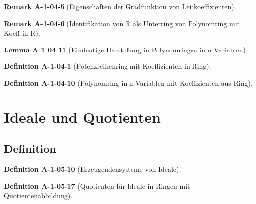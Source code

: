 \documentclass[10pt, letterpaper]{article}
\newcommand{\CustomHeading}[3]{%
  \par\medskip\noindent%
  \textbf{#1 #2} \textnormal{(#3)}.\enskip%
}
\newenvironment{DEF}[2]{\CustomHeading{Definition}{#1}{#2}}{}
\newenvironment{LEM}[2]{\CustomHeading{Lemma}{#1}{#2}}{}
\newenvironment{REM}[2]{\CustomHeading{Remark}{#1}{#2}}{}
\begin{document}
\begin{REM}{A-1-04-5}{Eigenschaften der Gradfunktion von Leitkoeffizienten}

\end{REM}

\begin{REM}{A-1-04-6}{Identifikation von R als Unterring von Polynomring mit Koeff in R}

\end{REM}















\begin{LEM}{A-1-04-11}{Eindeutige Darstellung in Polynomringen in n-Variablen}

\end{LEM}





\begin{DEF}{A-1-04-1}{Potenzreihenring mit Koeffizienten in Ring}

\end{DEF}

\begin{DEF}{A-1-04-10}{Polynomring in n-Variablen mit Koeffizienten aus Ring}

\end{DEF}







\section{Ideale und Quotienten}



\subsection{Definition}



\begin{DEF}{A-1-05-10}{Erzeugendensysteme von Ideale}

\end{DEF}

\begin{DEF}{A-1-05-17}{Quotienten für Ideale in Ringen mit Quotientenabbildung}

\end{DEF}
\end{document}
